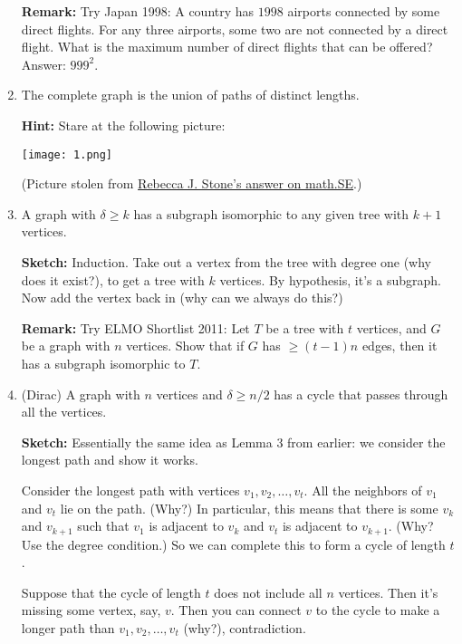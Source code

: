 \documentclass[11pt,paper=letter]{scrartcl}
\begin{document}
\begin{enumerate}
  \textbf{Remark:} Try Japan 1998: A country has $1998$ airports connected by some direct flights. For any three airports, some two are not connected by a direct flight. What is the maximum number of direct flights that can be offered? Answer: $999^2$.

  \item The complete graph is the union of paths of distinct lengths.

  \textbf{Hint:} Stare at the following picture:
  \begin{center}
    \texttt{[image: 1.png]}
  \end{center}

  (Picture stolen from \href{https://math.stackexchange.com/questions/2130583/partition-edges-of-complete-graph-into-paths-of-distinct-length}{Rebecca J. Stone's answer on math.SE}.)

  \item A graph with $\delta \geq k$ has a subgraph isomorphic to any given tree with $k+1$ vertices.

  \textbf{Sketch:} Induction. Take out a vertex from the tree with degree one (why does it exist?), to get a tree with $k$ vertices. By hypothesis, it's a subgraph. Now add the vertex back in (why can we always do this?)

  \textbf{Remark:} Try ELMO Shortlist 2011: Let $T$ be a tree with $t$ vertices, and $G$ be a graph with $n$ vertices. Show that if $G$ has $\geq (t-1)n$ edges, then it has a subgraph isomorphic to $T$.

  \item (Dirac) A graph with $n$ vertices and $\delta \geq n/2$ has a cycle that passes through all the vertices.

  \textbf{Sketch:} Essentially the same idea as Lemma 3 from earlier: we consider the longest path and show it works.

  Consider the longest path with vertices $v_1, v_2, \ldots, v_t$. All the neighbors of $v_1$ and $v_t$ lie on the path. (Why?) In particular, this means that there is some $v_k$ and $v_{k+1}$ such that $v_1$ is adjacent to $v_k$ and $v_t$ is adjacent to $v_{k+1}$. (Why? Use the degree condition.) So we can complete this to form a cycle of length $t$.

  Suppose that the cycle of length $t$ does not include all $n$ vertices. Then it's missing some vertex, say, $v$. Then you can connect $v$ to the cycle to make a longer path than $v_1, v_2, \ldots, v_t$ (why?), contradiction.


\end{enumerate}
\end{document}
